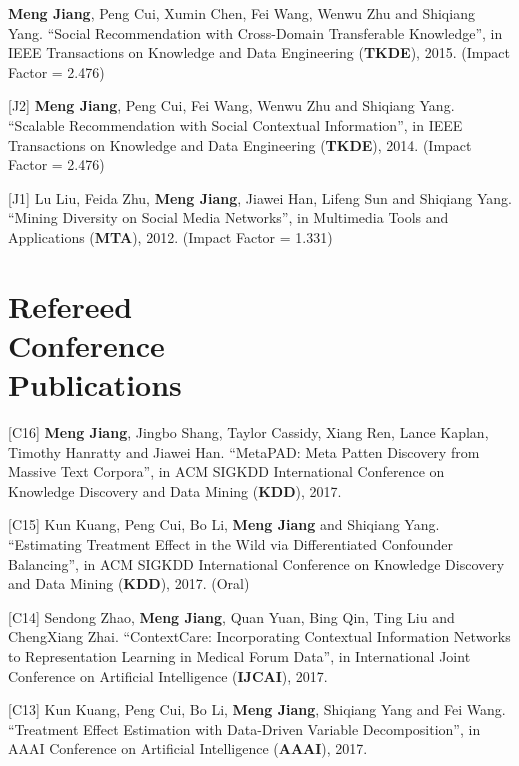 \documentclass[margin, 9pt]{res}
\begin{document}
\begin{resume}
[J3] \textbf{Meng Jiang}, Peng Cui, Xumin Chen, Fei Wang, Wenwu Zhu and Shiqiang Yang. ``Social Recommendation with Cross-Domain Transferable Knowledge'', in IEEE Transactions on Knowledge and Data Engineering (\textbf{TKDE}), 2015. (Impact Factor = 2.476)

[J2] \textbf{Meng Jiang}, Peng Cui, Fei Wang, Wenwu Zhu and Shiqiang Yang. ``Scalable Recommendation with Social Contextual Information'', in IEEE Transactions on Knowledge and Data Engineering (\textbf{TKDE}), 2014. (Impact Factor = 2.476)

[J1] Lu Liu, Feida Zhu, \textbf{Meng Jiang}, Jiawei Han, Lifeng Sun and Shiqiang Yang. ``Mining Diversity on Social Media Networks'', in Multimedia Tools and Applications (\textbf{MTA}), 2012. (Impact Factor = 1.331)


\section{Refereed \\ Conference \\ Publications}

[C16] \textbf{Meng Jiang}, Jingbo Shang, Taylor Cassidy, Xiang Ren, Lance Kaplan, Timothy Hanratty and Jiawei Han. ``MetaPAD: Meta Patten Discovery from Massive Text Corpora'', in ACM SIGKDD International Conference on Knowledge Discovery and Data Mining (\textbf{KDD}), 2017.

[C15] Kun Kuang, Peng Cui, Bo Li, \textbf{Meng Jiang} and Shiqiang Yang. ``Estimating Treatment Effect in the Wild via Differentiated Confounder Balancing'', in ACM SIGKDD International Conference on Knowledge Discovery and Data Mining (\textbf{KDD}), 2017. (Oral)

[C14] Sendong Zhao, \textbf{Meng Jiang}, Quan Yuan, Bing Qin, Ting Liu and ChengXiang Zhai. ``ContextCare: Incorporating Contextual Information Networks to Representation Learning in Medical Forum Data'', in International Joint Conference on Artificial Intelligence (\textbf{IJCAI}), 2017.

[C13] Kun Kuang, Peng Cui, Bo Li, \textbf{Meng Jiang}, Shiqiang Yang and Fei Wang. ``Treatment Effect Estimation with Data-Driven Variable Decomposition'', in AAAI Conference on Artificial Intelligence (\textbf{AAAI}), 2017.


\end{resume}
\end{document}

